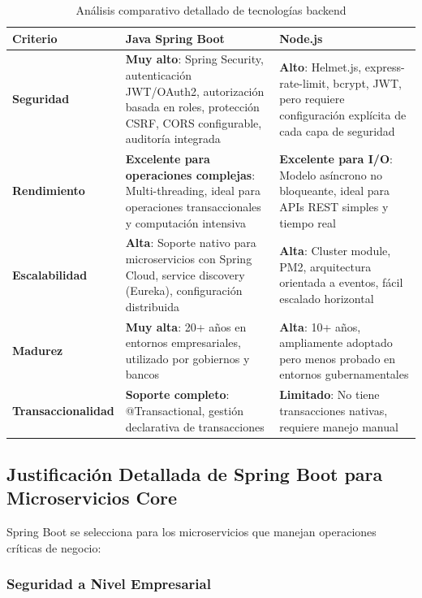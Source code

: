 \begin{table}[h]
\centering
\caption{Análisis comparativo detallado de tecnologías backend}
\label{tab:comparativa-backend}
\begin{tabular}{|p{2.8cm}|p{4cm}|p{4cm}|}
\hline
\textbf{Criterio} & \textbf{Java Spring Boot} & \textbf{Node.js} \\
\hline
\textbf{Seguridad} & \textbf{Muy alto}: Spring Security, autenticación JWT/OAuth2, autorización basada en roles, protección CSRF, CORS configurable, auditoría integrada & \textbf{Alto}: Helmet.js, express-rate-limit, bcrypt, JWT, pero requiere configuración explícita de cada capa de seguridad \\
\hline
\textbf{Rendimiento} & \textbf{Excelente para operaciones complejas}: Multi-threading, ideal para operaciones transaccionales y computación intensiva & \textbf{Excelente para I/O}: Modelo asíncrono no bloqueante, ideal para APIs REST simples y tiempo real \\
\hline
\textbf{Escalabilidad} & \textbf{Alta}: Soporte nativo para microservicios con Spring Cloud, service discovery (Eureka), configuración distribuida & \textbf{Alta}: Cluster module, PM2, arquitectura orientada a eventos, fácil escalado horizontal \\
\hline
\textbf{Madurez} & \textbf{Muy alta}: 20+ años en entornos empresariales, utilizado por gobiernos y bancos & \textbf{Alta}: 10+ años, ampliamente adoptado pero menos probado en entornos gubernamentales \\
\hline
\textbf{Transaccionalidad} & \textbf{Soporte completo}: @Transactional, gestión declarativa de transacciones & \textbf{Limitado}: No tiene transacciones nativas, requiere manejo manual \\
\hline
\end{tabular}
\end{table}

\subsection{Justificación Detallada de Spring Boot para Microservicios Core}

Spring Boot se selecciona para los microservicios que manejan operaciones críticas de negocio:

\subsubsection{Seguridad a Nivel Empresarial}


